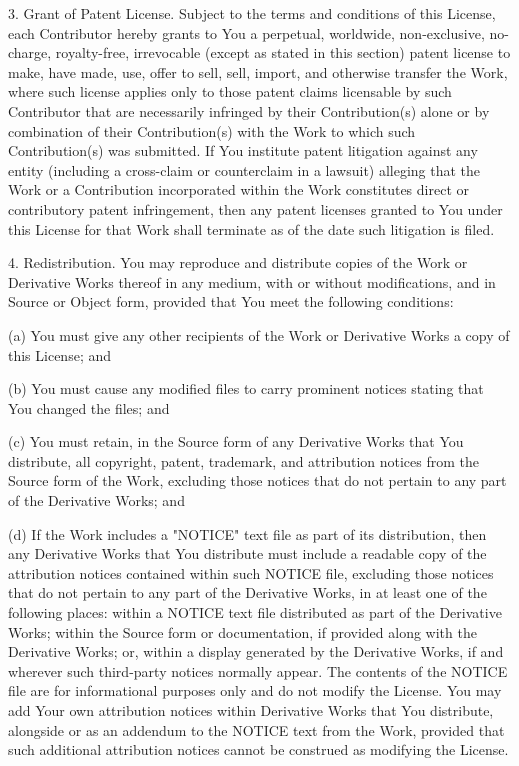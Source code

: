 \documentclass[twoside]{tceusermanual}
\begin{document}
   3. Grant of Patent License. Subject to the terms and conditions of
      this License, each Contributor hereby grants to You a perpetual,
      worldwide, non-exclusive, no-charge, royalty-free, irrevocable
      (except as stated in this section) patent license to make, have made,
      use, offer to sell, sell, import, and otherwise transfer the Work,
      where such license applies only to those patent claims licensable
      by such Contributor that are necessarily infringed by their
      Contribution(s) alone or by combination of their Contribution(s)
      with the Work to which such Contribution(s) was submitted. If You
      institute patent litigation against any entity (including a
      cross-claim or counterclaim in a lawsuit) alleging that the Work
      or a Contribution incorporated within the Work constitutes direct
      or contributory patent infringement, then any patent licenses
      granted to You under this License for that Work shall terminate
      as of the date such litigation is filed.

   4. Redistribution. You may reproduce and distribute copies of the
      Work or Derivative Works thereof in any medium, with or without
      modifications, and in Source or Object form, provided that You
      meet the following conditions:

      (a) You must give any other recipients of the Work or
          Derivative Works a copy of this License; and

      (b) You must cause any modified files to carry prominent notices
          stating that You changed the files; and

      (c) You must retain, in the Source form of any Derivative Works
          that You distribute, all copyright, patent, trademark, and
          attribution notices from the Source form of the Work,
          excluding those notices that do not pertain to any part of
          the Derivative Works; and

      (d) If the Work includes a "NOTICE" text file as part of its
          distribution, then any Derivative Works that You distribute must
          include a readable copy of the attribution notices contained
          within such NOTICE file, excluding those notices that do not
          pertain to any part of the Derivative Works, in at least one
          of the following places: within a NOTICE text file distributed
          as part of the Derivative Works; within the Source form or
          documentation, if provided along with the Derivative Works; or,
          within a display generated by the Derivative Works, if and
          wherever such third-party notices normally appear. The contents
          of the NOTICE file are for informational purposes only and
          do not modify the License. You may add Your own attribution
          notices within Derivative Works that You distribute, alongside
          or as an addendum to the NOTICE text from the Work, provided
          that such additional attribution notices cannot be construed
          as modifying the License.
\end{document}
